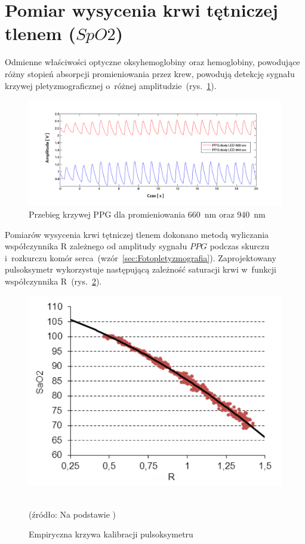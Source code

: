 \section{Pomiar wysycenia krwi tętniczej tlenem ($SpO2$)}
\label{sec:Saturacja}

Odmienne właściwości optyczne oksyhemoglobiny oraz hemoglobiny, powodujące różny stopień absorpcji promieniowania przez krew,
powodują detekcję sygnału krzywej pletyzmograficznej o~różnej amplitudzie~(rys.~\ref{rys:PPG1}).
\begin{figure}[!ht]
	\centerline{\includegraphics[scale = 0.6]{graphic/PPG1}}
	\caption{Przebieg krzywej PPG dla promieniowania 660~nm oraz 940~nm}
	\label{rys:PPG1}
\end{figure}

Pomiarów wysycenia krwi tętniczej tlenem dokonano metodą wyliczania współczynnika R zależnego od amplitudy sygnału $PPG$ podczas
skurczu i~rozkurczu komór serca~(wzór~\ref{sec:Fotopletyzmografia}). Zaprojektowany pulsoksymetr wykorzystuje następującą zależność 
saturacji krwi w~funkcji współczynnika R~(rys.~\ref{rys:curve}). 
\begin{figure}[!h]
	\centerline{\includegraphics[scale = 0.51]{graphic/curve}}
	\caption{Empiryczna krzywa kalibracji pulsoksymetru}
	\label{rys:curve}
	~\\	
	(źródło: Na podstawie \cite{Katja:2011})
\end{figure}

